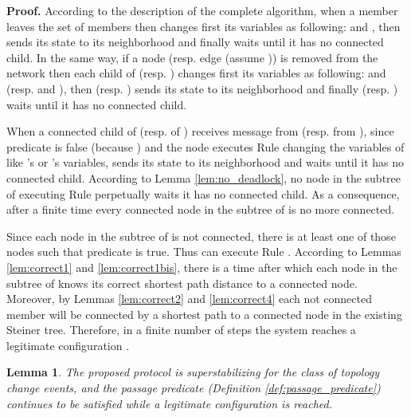 \documentclass[11pt]{article}
\newtheorem{lemma}{Lemma}
\newenvironment{proof}{\noindent \begin{rm}{\textbf{Proof.} }}{\hspace*{\fill}\par\end{rm} \vspace{.3cm}}
\newcommand{\ARA}{}
\newcommand{\CRG}{}
\begin{document}
\begin{proof}
According to the description of the complete algorithm, when a member  leaves the set of members  then  changes first its variables as following:  and , then  sends its state to its neighborhood and finally  waits until it has no connected child. In the same way, if a node  (resp. edge  (assume )) is removed from the network then each child  of  (resp. ) changes first its variables as following:  and  (resp.  and ), then  (resp. ) sends its state to its neighborhood and finally  (resp. ) waits until it has no connected child.

When a connected child  of  (resp. of ) receives message  from  (resp.  from ), since predicate  is false (because ) and  the node  executes Rule \CRG\/ changing the variables of  like 's or 's variables, sends its state to its neighborhood and waits until it has no connected child. According to Lemma \ref{lem:no_deadlock}, no node in the subtree of  executing Rule \CRG\/ perpetually waits it has no connected child. As a consequence, after a finite time every connected node  in the subtree of  is no more connected.

Since each node in the subtree of  is not connected, there is at least one of those nodes  such that predicate  is true. Thus  can execute Rule \ARA\/. According to Lemmas \ref{lem:correct1} and \ref{lem:correct1bis}, there is a time after which each node in the subtree of  knows its correct shortest path distance to a connected node. Moreover, by Lemmas \ref{lem:correct2} and \ref{lem:correct4} each not connected member will be connected by a shortest path to a connected node in the existing Steiner tree. Therefore, in a finite number of steps the system reaches a legitimate configuration .
\end{proof}

\begin{lemma}
\label{lem:2}
The proposed protocol is superstabilizing for the class  of
topology change events, and the passage predicate (Definition
\ref{def:passage_predicate}) continues to be satisfied while a
legitimate configuration is reached.
\end{lemma}
\end{document}
